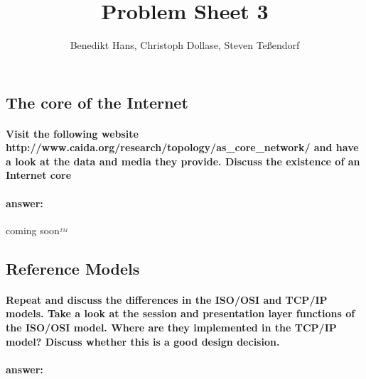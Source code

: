 \documentclass[a4paper,12pt]{article}
\author{Benedikt Hans, Christoph Dollase, Steven Te\ss endorf}
\title{ \textbf{Problem Sheet 3}}
\begin{document}
	 
 \maketitle	 %
 
 \subsection{The core of the Internet}
 \paragraph{Visit the following website http://www.caida.org/research/topology/as\_core\_network/ and have a look at the data and media they provide. Discuss the existence of an Internet core}
 \paragraph{answer:}
 
 coming soon$^{_{TM}}$
 
 \subsection{Reference Models}
 \paragraph{Repeat and discuss the differences in the ISO/OSI and TCP/IP models. Take a look at the session and presentation layer functions of the ISO/OSI model. Where are they implemented in the TCP/IP model? Discuss whether this is a good design decision. }
 \paragraph{answer:}
 
\end{document}
